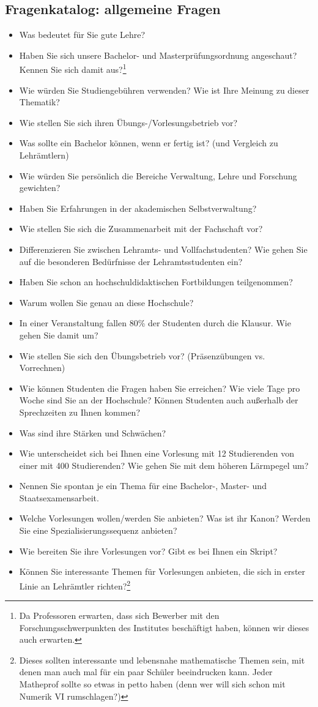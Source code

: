 \documentclass[10pt,twoside,a5paper,openright]{book}
\begin{document}
\subsection{Fragenkatalog: allgemeine Fragen}
\begin{itemize}
	\item Was bedeutet für Sie gute Lehre?
	\item Haben Sie sich unsere Bachelor- und Masterprüfungsordnung angeschaut? Kennen Sie sich damit aus?\footnote{Da Professoren erwarten, dass sich Bewerber mit den Forschungsschwerpunkten des Institutes beschäftigt haben, können wir dieses auch erwarten.}
	\item Wie würden Sie Studiengebühren verwenden? Wie ist Ihre Meinung zu dieser Thematik?
	\item Wie stellen Sie sich ihren Übungs-/Vorlesungsbetrieb vor?
	\item Was sollte ein Bachelor können, wenn er fertig ist? (und Vergleich zu Lehrämtlern)
	\item Wie würden Sie persönlich die Bereiche Verwaltung, Lehre und Forschung gewichten?
	\item Haben Sie Erfahrungen in der akademischen Selbstverwaltung?
	\item Wie stellen Sie sich die Zusammenarbeit mit der Fachschaft vor?
	\item Differenzieren Sie zwischen Lehramts- und Vollfachstudenten? Wie gehen Sie auf die besonderen Bedürfnisse der Lehramtsstudenten ein?
	\item Haben Sie schon an hochschuldidaktischen Fortbildungen teilgenommen?
	\item Warum wollen Sie genau an diese Hochschule?
	\item In einer Veranstaltung fallen 80\% der Studenten durch die Klausur. Wie gehen Sie damit um?
	\item Wie stellen Sie sich den Übungsbetrieb vor? (Präsenzübungen vs. Vorrechnen)
	\item Wie können Studenten die Fragen haben Sie erreichen? Wie viele Tage pro Woche sind Sie an der Hochschule? Können Studenten auch außerhalb der Sprechzeiten zu Ihnen kommen?
	\item Was sind ihre Stärken und Schwächen?
	\item Wie unterscheidet sich bei Ihnen eine Vorlesung mit 12 Studierenden von einer mit 400 Studierenden? Wie gehen Sie mit dem höheren Lärmpegel um?
	\item Nennen Sie spontan je ein Thema für eine Bachelor-, Master- und Staatsexamensarbeit.
	\item Welche Vorlesungen wollen/werden Sie anbieten? Was ist ihr Kanon? Werden Sie eine Spezialisierungssequenz anbieten?
	\item Wie bereiten Sie ihre Vorlesungen vor? Gibt es bei Ihnen ein Skript?
	\item Können Sie interessante Themen für Vorlesungen anbieten, die sich in erster Linie an Lehrämtler richten?\footnote{Dieses sollten interessante und lebensnahe mathematische Themen sein, mit denen man auch mal für ein paar Schüler beeindrucken kann. Jeder Matheprof sollte so etwas in petto haben (denn wer will sich schon mit Numerik VI rumschlagen?)}
\end{itemize}
\end{document}
